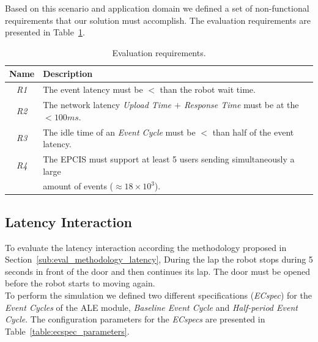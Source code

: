 Based on this scenario and application domain we defined a set of non-functional requirements that
our solution must accomplish. The evaluation requirements are presented in Table~\ref{table:eval_requirements}.

\begin{table}[ht!]
  \begin{tabular}{|c|l|}
    \hline
    Name          & Description                                                                                                         \\ \hline
    \textit{R1}   & The event latency must be $<$ than the robot wait time.                                                             \\ \hline
    \textit{R2}   & The network latency \textit{Upload Time $+$ Response Time} must be at the $< 100ms$.                                \\ \hline
    \textit{R3}   & The idle time of an \textit{Event Cycle} must be $<$ than half of the event latency.                                \\ \hline
    \textit{R4}   & The EPCIS must support at least 5 users sending simultaneously a large                                                       \\
    ~             & amount of events ($\approx18\times10^{3}$).                                                                 \\ \hline
  \end{tabular}
  \caption{Evaluation requirements.}
  \label{table:eval_requirements}
\end{table}

\subsection{Latency Interaction}
\label{sub:eval_exp_latency}
To evaluate the latency interaction according the methodology proposed in Section~\ref{sub:eval_methodology_latency},
During the lap the robot stops during 5 seconds in front of the door and then continues its lap.
The door must be opened before the robot starts to moving again.\\

To perform the simulation we defined two different specifications (\textit{ECspec}) for the
\textit{Event Cycles} of the \gls{ALE} module, \textit{Baseline Event Cycle} and
\textit{Half-period Event Cycle}. The configuration parameters for the \textit{ECspecs} are presented
in Table~\ref{table:ecspec_parameters}.

